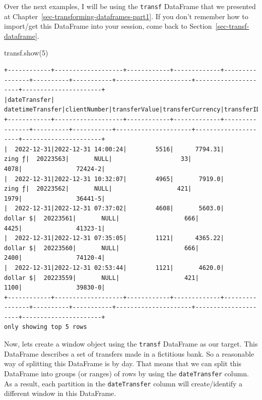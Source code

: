 \documentclass[
  11pt,
  letterpaper,
  DIV=11,
  numbers=noendperiod]{scrreprt}
\newenvironment{Shaded}{\begin{snugshade}}{\end{snugshade}}
\newcommand{\DecValTok}[1]{\textcolor[rgb]{0.68,0.00,0.00}{#1}}
\newcommand{\NormalTok}[1]{\textcolor[rgb]{0.00,0.23,0.31}{#1}}
\begin{document}
Over the next examples, I will be using the \texttt{transf} DataFrame
that we presented at Chapter~\ref{sec-transforming-dataframes-part1}. If
you don't remember how to import/get this DataFrame into your session,
come back to Section~\ref{sec-transf-dataframe}.

\begin{Shaded}
\begin{Highlighting}[]
\NormalTok{transf.show(}\DecValTok{5}\NormalTok{)}
\end{Highlighting}
\end{Shaded}

\begin{verbatim}
+------------+-------------------+------------+-------------+----------------+----------+-----------+---------------------+---------------------+----------------------+
|dateTransfer|   datetimeTransfer|clientNumber|transferValue|transferCurrency|transferID|transferLog|destinationBankNumber|destinationBankBranch|destinationBankAccount|
+------------+-------------------+------------+-------------+----------------+----------+-----------+---------------------+---------------------+----------------------+
|  2022-12-31|2022-12-31 14:00:24|        5516|      7794.31|          zing ƒ|  20223563|       NULL|                   33|                 4078|               72424-2|
|  2022-12-31|2022-12-31 10:32:07|        4965|       7919.0|          zing ƒ|  20223562|       NULL|                  421|                 1979|               36441-5|
|  2022-12-31|2022-12-31 07:37:02|        4608|       5603.0|        dollar $|  20223561|       NULL|                  666|                 4425|               41323-1|
|  2022-12-31|2022-12-31 07:35:05|        1121|      4365.22|        dollar $|  20223560|       NULL|                  666|                 2400|               74120-4|
|  2022-12-31|2022-12-31 02:53:44|        1121|       4620.0|        dollar $|  20223559|       NULL|                  421|                 1100|               39830-0|
+------------+-------------------+------------+-------------+----------------+----------+-----------+---------------------+---------------------+----------------------+
only showing top 5 rows
\end{verbatim}

Now, lets create a window object using the \texttt{transf} DataFrame as
our target. This DataFrame describes a set of transfers made in a
fictitious bank. So a reasonable way of splitting this DataFrame is by
day. That means that we can split this DataFrame into groups (or ranges)
of rows by using the \texttt{dateTransfer} column. As a result, each
partition in the \texttt{dateTransfer} column will create/identify a
different window in this DataFrame.
\end{document}
